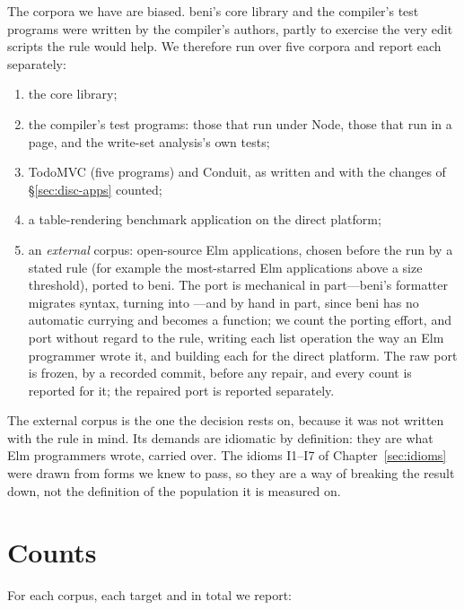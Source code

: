 The corpora we have are biased. beni's core library and the compiler's test programs were written by the
compiler's authors, partly to exercise the very edit scripts the rule would help. We therefore run over
five corpora and report each separately:
\begin{enumerate}
\item the core library;
\item the compiler's test programs: those that run under Node, those that run in a page, and the
write-set analysis's own tests;
\item TodoMVC (five programs) and Conduit, as written and with the changes of \S\ref{sec:disc-apps}
counted;
\item a table-rendering benchmark application on the direct platform;
\item an \emph{external} corpus: open-source Elm applications, chosen before the run by a stated rule
(for example the most-starred Elm applications above a size threshold), ported to beni. The port is
mechanical in part---beni's formatter migrates syntax, turning  into \code{[ x, …acc ]}---and
by hand in part, since beni has no automatic currying and  becomes a function; we count the
porting effort, and port without regard to the rule, writing each list operation the way an Elm
programmer wrote it, and building each for the direct platform. The raw port is frozen, by a recorded
commit, before any repair, and every count is reported for it; the repaired port is reported separately.
\end{enumerate}
The external corpus is the one the decision rests on, because it was not written with the rule in mind.
Its demands are idiomatic by definition: they are what Elm programmers wrote, carried over. The idioms
I1--I7 of Chapter~\ref{sec:idioms} were drawn from forms we knew to pass, so they are a way of breaking the
result down, not the definition of the population it is measured on.

\section{Counts}
\label{sec:eval-counts}

For each corpus, each target and in total we report:

